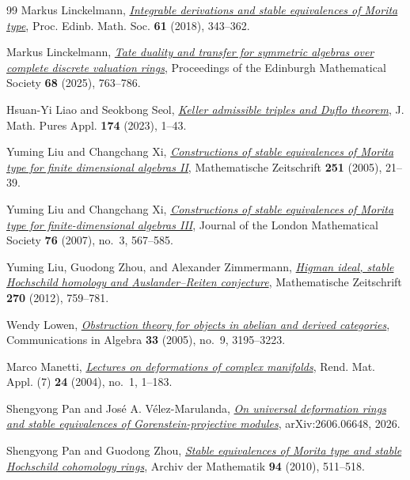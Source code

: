 \documentclass[12pt,a4paper,english,reqno]{amsart}
\numberwithin{equation}{section}
\theoremstyle{plain}
\theoremstyle{definition}
\begin{document}
\begin{thebibliography}{99}
Markus Linckelmann,
  \emph{\href{https://arxiv.org/abs/1506.04676}{Integrable derivations
  and stable equivalences of Morita type}}, Proc. Edinb. Math. Soc.
  \textbf{61} (2018), 343--362.

Markus Linckelmann, \emph{\href{https://doi.org/10.1017/S0013091524000671}{Tate duality
  and transfer for symmetric algebras over complete discrete valuation rings}},
  Proceedings of the Edinburgh Mathematical Society \textbf{68} (2025),
  763--786.

Hsuan-Yi Liao and Seokbong Seol,
\emph{\href{https://doi.org/10.1016/j.matpur.2023.02.003}{Keller
admissible triples and Duflo theorem}},
J. Math. Pures Appl. \textbf{174} (2023), 1--43.

Yuming Liu and Changchang Xi,
  \emph{\href{https://doi.org/10.1007/s00209-005-0786-9}{Constructions of
  stable equivalences of {Morita} type for finite dimensional algebras {II}}},
  Mathematische Zeitschrift \textbf{251} (2005), 21--39.

Yuming Liu and Changchang Xi, \emph{\href{https://doi.org/10.1112/jlms/jdm065}{Constructions of
  stable equivalences of {Morita} type for finite-dimensional algebras {III}}},
  Journal of the London Mathematical Society \textbf{76} (2007), no.~3,
  567--585.

Yuming Liu, Guodong Zhou, and Alexander Zimmermann,
  \emph{\href{https://doi.org/10.1007/s00209-010-0825-z}{Higman ideal, stable
  {Hochschild} homology and {Auslander--Reiten} conjecture}}, Mathematische
  Zeitschrift \textbf{270} (2012), 759--781.

Wendy Lowen, \emph{\href{https://doi.org/10.1081/AGB-200066155}
  {Obstruction theory for objects in abelian and derived categories}},
  Communications in Algebra \textbf{33} (2005), no.~9, 3195--3223.

Marco Manetti,
\emph{\href{https://arxiv.org/abs/math/0507286}{Lectures on deformations of complex manifolds}},
Rend. Mat. Appl. (7) \textbf{24} (2004), no.~1, 1--183.

Shengyong Pan and Jos\'e A. V\'elez-Marulanda,
  \emph{\href{https://arxiv.org/abs/2606.06648}
  {On universal deformation rings and stable equivalences of
   {Gorenstein}-projective modules}}, arXiv:2606.06648, 2026.

Shengyong Pan and Guodong Zhou,
  \emph{\href{https://doi.org/10.1007/s00013-010-0137-x}{Stable equivalences of
  {Morita} type and stable {Hochschild} cohomology rings}}, Archiv der
  Mathematik \textbf{94} (2010), 511--518.


\end{thebibliography}
\end{document}

